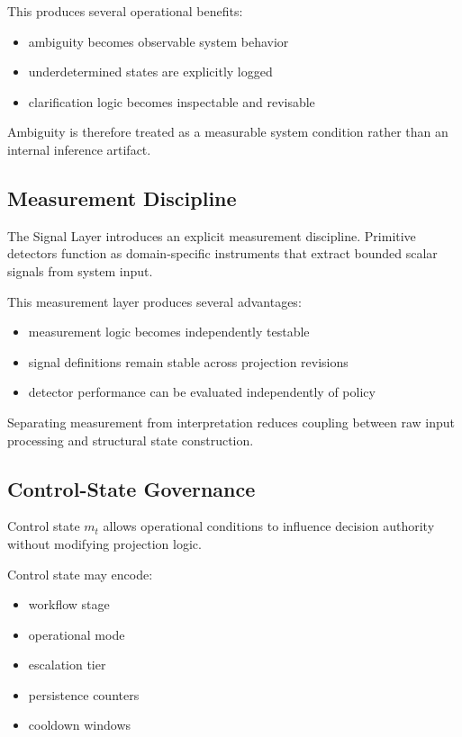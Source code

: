 \documentclass[11pt]{article}
\begin{document}
This produces several operational benefits:

\begin{itemize}
  \item ambiguity becomes observable system behavior
  \item underdetermined states are explicitly logged
  \item clarification logic becomes inspectable and revisable
\end{itemize}

Ambiguity is therefore treated as a measurable system condition rather than an internal inference artifact.

\subsection{Measurement Discipline}

The Signal Layer introduces an explicit measurement discipline. Primitive detectors function as domain-specific instruments that extract bounded scalar signals from system input.

This measurement layer produces several advantages:

\begin{itemize}
  \item measurement logic becomes independently testable
  \item signal definitions remain stable across projection revisions
  \item detector performance can be evaluated independently of policy
\end{itemize}

Separating measurement from interpretation reduces coupling between raw input processing and structural state construction.

\subsection{Control-State Governance}

Control state $m_t$ allows operational conditions to influence decision authority without modifying projection logic.

Control state may encode:

\begin{itemize}
  \item workflow stage
  \item operational mode
  \item escalation tier
  \item persistence counters
  \item cooldown windows
\end{itemize}
\end{document}
